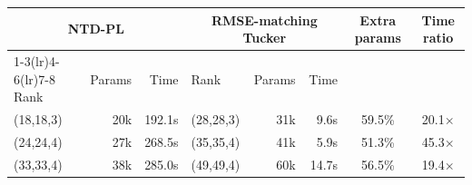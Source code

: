 \begin{tabular}{@{}l r r l r r c c@{}}
\toprule
\multicolumn{3}{c}{NTD-PL} & \multicolumn{3}{c}{RMSE-matching Tucker} & Extra params & Time ratio \\
\cmidrule(lr){1-3}\cmidrule(lr){4-6}\cmidrule(lr){7-8}
Rank & Params & Time & Rank & Params & Time & & \\
\midrule
(18,18,3) & 20k & 192.1s & (28,28,3) & 31k & 9.6s & 59.5\% & 20.1$\times$\\
(24,24,4) & 27k & 268.5s & (35,35,4) & 41k & 5.9s & 51.3\% & 45.3$\times$\\
(33,33,4) & 38k & 285.0s & (49,49,4) & 60k & 14.7s & 56.5\% & 19.4$\times$\\
\bottomrule
\end{tabular}
